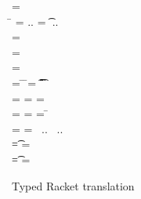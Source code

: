 \documentclass[acmsmall, anonymous, authordraft, review]{acmart} %
\begin{document}
\begin{figure}[!b]

\hrulefill

\medskip

 \small
\begin{minipage}{12cm}  
\begin{tabbing}
 =  \\
\hspace{4.6cm}\= \WHERE\HS 
  \mdp[1] = \src{\Mdef\m\x\t\tp{\ep[1]}} ..\HS\HS
  \md[1] = \Mdef\m\x\t\tp{\e[1]} ..\HS\HS \\
  \>\qquad\HS\HS\HS\HS \ep[1] = \TRG{\e[1]}{\x:\t\,\this:\C}
\\
\TRG\x\Env = \src{\x}
\\
\TRG{\FRead\f}\Env  = \src{\FRead\f}
\\
\TRG{\FWrite\f\e}\Env =  \src{\FWrite\f\ep} 
\>\WHERE\HS
\= \TypeCk\K{\this}\C \HS\HS
\=  \ep = \TAG\e\Env\t \HS\HS
\= \Ftype\f\t\In\App\K\C
\\
\TRG{\Call{\e[1]}\m{\e[2]}}\Env = \src{\DynCall{\ep[1]}\m{\ep[2]}}
\>\WHERE \> \TypeCk{\K,\Env}{\e[1]}\any \HS
\> \ep[1] = \TRG{\e[1]}\Env \HS
\> \ep[2] = \TAG{\e[2]}\Env\any
\\
\TRG{\Call{\e[1]}\m{\e[2]}}\Env = \src{\KCall{\ep[1]}\m{\ep[2]}{\D[1]}{\D[2]}}
\>\WHERE \> \TypeCk{\K,\Env}{\e[1]}\C 
\> \ep[1] = \TRG{\e[1]}\Env\HS\HS
\> \ep[2] = \TAG{\e[2]}\Env{\D[1]} \HS\HS
\=  \Mtype\m{\D[1]}{\D[2]}\In\App\K\C 
\\
\Env =  
\>\WHERE \>  \ep[1] = \TAG{\e[1]}\Env{\t[1]} ~..
\> \Ftype{\f[1]}{\t[1]}\In\App\K\C ~..
\\
\TAG\e\Env\t = \src\ep
\> \WHERE\> \TypeCk{\K,\Env}\e\tp \HS
\> \EM{\K\vdash \t \Sub \tp}
\>  \ep = \TRG\e\Env
\\
\TAG\e\Env\t = \src{\BehCast\t\e}
\>\WHERE\> \TypeCk{\K,\Env}\e\tp \HS
   \> \EM{\K\vdash \t \not \Sub \tp}
  \>     \ep = \TRG\e\Env
\end{tabbing}
\end{minipage}

\medskip

\hrulefill
\caption{Typed Racket translation}\label{trtr}
\end{figure}
\end{document}
